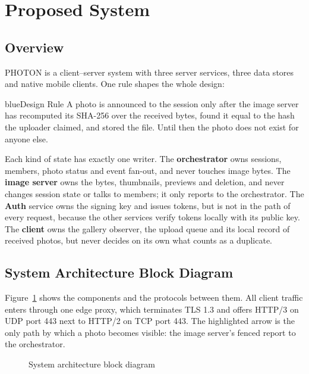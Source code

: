 \section{Proposed System}\label{sec:proposed}

\subsection{Overview}

PHOTON is a client--server system with three server services, three data stores and native mobile clients. One rule shapes the whole design:

\begin{pbox}{blue}{Design Rule}
A photo is announced to the session only after the image server has recomputed its SHA-256 over the received bytes, found it equal to the hash the uploader claimed, and stored the file. Until then the photo does not exist for anyone else.
\end{pbox}

Each kind of state has exactly one writer. The \textbf{orchestrator} owns sessions, members, photo status and event fan-out, and never touches image bytes. The \textbf{image server} owns the bytes, thumbnails, previews and deletion, and never changes session state or talks to members; it only reports to the orchestrator. The \textbf{Auth} service owns the signing key and issues tokens, but is not in the path of every request, because the other services verify tokens locally with its public key. The \textbf{client} owns the gallery observer, the upload queue and its local record of received photos, but never decides on its own what counts as a duplicate.

\subsection{System Architecture Block Diagram}

Figure~\ref{fig:arch} shows the components and the protocols between them. All client traffic enters through one edge proxy, which terminates TLS 1.3 and offers HTTP/3 on UDP port 443 next to HTTP/2 on TCP port 443. The highlighted arrow is the only path by which a photo becomes visible: the image server's fenced report to the orchestrator.

\begin{figure}[H]
\centering
{}
\caption{System architecture block diagram}\label{fig:arch}
\end{figure}


